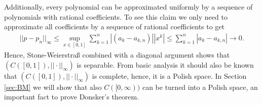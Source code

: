 Additionally, every polynomial can be approximated uniformly by a sequence of polynomials with rational coefficients. To see this claim we only need to approximate all coefficients by a sequence of rational coefficients to get
\begin{align*}
	||p-p_n||_\infty \leq  \sup_{x\in [0,1]}\sum_{k=1}^n |(a_k-a_{k,n})||x^k|\leq \sum_{k=1}^n |a_k-a_{k,n}|\to 0.
\end{align*}
Hence, Stone-Weierstra\ss{} combined with a diagonal argument shows that $( C([0,1]),||\cdot||_\infty)$ is separable. From basic analysis it should also be known that $( C([0,1]),||\cdot||_\infty)$ is complete, hence, it is a Polish space. In Section \ref{sec:BM} we will show that also $C([0,\infty))$ can be turned into a Polish space, an important fact to prove Donsker's theorem.
\smallskip

